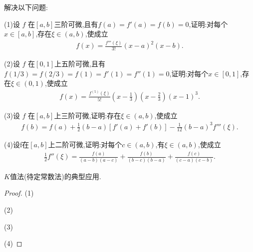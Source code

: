 \documentclass[lang=cn,newtx,10pt,scheme=chinese]{../Template/elegantbook}
\begin{document}
\begin{exercise}
解决以下问题:

(1)设 \( f \) 在\([a, b]\)三阶可微,且有\( f(a) = f'(a) = f(b) = 0\),证明:对每个\( x \in [a, b]\),存在\( \xi \in (a, b)\),使成立
\begin{align}
   f(x) = \frac{f'''(\xi)}{3!}(x - a)^2(x - b)
   .\nonumber
\end{align}

(2)设 \( f \) 在\([0, 1]\)上五阶可微,且有\( f(1/3) = f(2/3) = f(1) = f'(1) = f''(1) = 0\),证明:对每个\( x \in [0, 1]\),存在\( \xi \in (0, 1)\),使成立
\begin{align}
   f(x) = \frac{f^{(5)}(\xi)}{5!}\left(x - \frac{1}{3}\right)\left(x - \frac{2}{3}\right)(x - 1)^3
   .\nonumber
\end{align}

(3)设 \( f \) 在\([a, b]\)上三阶可微,证明:存在\( \xi \in (a, b)\),使成立
\begin{align}
   f(b) = f(a) + \frac{1}{2}(b - a)[f'(a) + f'(b)] - \frac{1}{12}(b - a)^3f'''(\xi)
   .\nonumber
\end{align}

(4)设f在$[a,b]$上二阶可微,证明:对每个$c\in(a,b)$,有$\xi\in(a,b)$,使成立
\begin{align}
    \frac{1}{2}f''(\xi)=\frac{f(a)}{(a-b)(a-c)}+\frac{f(b)}{(b-c)(b-a)}+\frac{f(c)}{(c-a)(c-b)}.
    \nonumber
\end{align}
\end{exercise}
\begin{note}
    $K$值法(待定常数法)的典型应用.
\end{note}
\begin{proof}
        (1)

        (2)

        (3)

        (4)

\end{proof}
\end{document}
